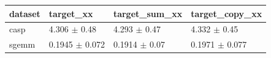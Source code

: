 \begin{tabular}{llll}
\toprule
dataset & target\_xx & target\_sum\_xx & target\_copy\_xx \\
\midrule
casp & 4.306 $\pm$ 0.48 & 4.293 $\pm$ 0.47 & 4.332 $\pm$ 0.45 \\
sgemm & 0.1945 $\pm$ 0.072 & 0.1914 $\pm$ 0.07 & 0.1971 $\pm$ 0.077 \\
\bottomrule
\end{tabular}
